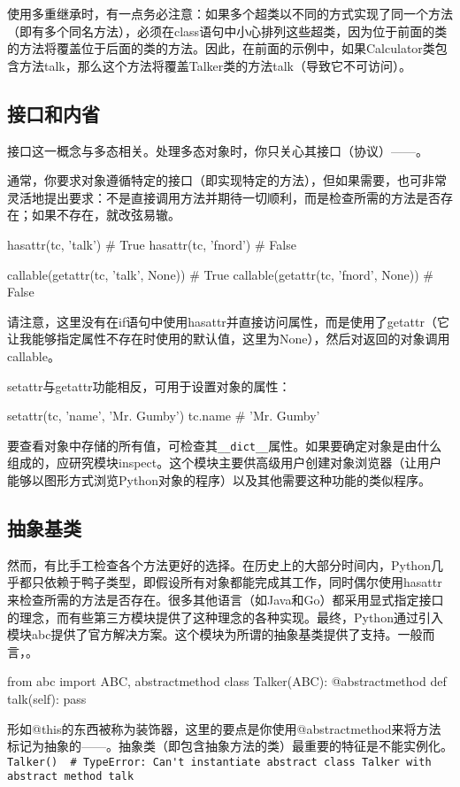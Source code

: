 使用多重继承时，有一点务必注意：如果多个超类以不同的方式实现了同一个方法（即有多个同名方法），必须在class语句中小心排列这些超类，因为位于前面的类的方法将覆盖位于后面的类的方法。因此，在前面的示例中，如果Calculator类包含方法talk，那么这个方法将覆盖Talker类的方法talk（导致它不可访问）。

\subsection{接口和内省}
接口这一概念与多态相关。处理多态对象时，你只关心其接口（协议）——。

通常，你要求对象遵循特定的接口（即实现特定的方法），但如果需要，也可非常灵活地提出要求：不是直接调用方法并期待一切顺利，而是检查所需的方法是否存在；如果不存在，就改弦易辙。
\begin{pyc}
hasattr(tc, 'talk')  # True
hasattr(tc, 'fnord')  # False
\end{pyc}

\begin{pyc}
callable(getattr(tc, 'talk', None))  # True
callable(getattr(tc, 'fnord', None))  # False
\end{pyc}
请注意，这里没有在if语句中使用hasattr并直接访问属性，而是使用了getattr（它让我能够指定属性不存在时使用的默认值，这里为None），然后对返回的对象调用callable。
\begin{tcolorbox}
    setattr与getattr功能相反，可用于设置对象的属性：
    \begin{pyc}
setattr(tc, 'name', 'Mr. Gumby')
tc.name  # 'Mr. Gumby'
    \end{pyc}
\end{tcolorbox}

要查看对象中存储的所有值，可检查其\verb|__dict__|属性。如果要确定对象是由什么组成的，应研究模块inspect。这个模块主要供高级用户创建对象浏览器（让用户能够以图形方式浏览Python对象的程序）以及其他需要这种功能的类似程序。

\subsection{抽象基类}
然而，有比手工检查各个方法更好的选择。在历史上的大部分时间内，Python几乎都只依赖于鸭子类型，即假设所有对象都能完成其工作，同时偶尔使用hasattr来检查所需的方法是否存在。很多其他语言（如Java和Go）都采用显式指定接口的理念，而有些第三方模块提供了这种理念的各种实现。最终，Python通过引入模块abc提供了官方解决方案。这个模块为所谓的抽象基类提供了支持。一般而言，。
\begin{pyc}
from abc import ABC, abstractmethod
class Talker(ABC):
    @abstractmethod
    def talk(self):
        pass
\end{pyc}
形如@this的东西被称为装饰器，这里的要点是你使用@abstractmethod来将方法标记为抽象的——。抽象类（即包含抽象方法的类）最重要的特征是不能实例化。\\
\verb|Talker()  # TypeError: Can't instantiate abstract class Talker with abstract method talk|

